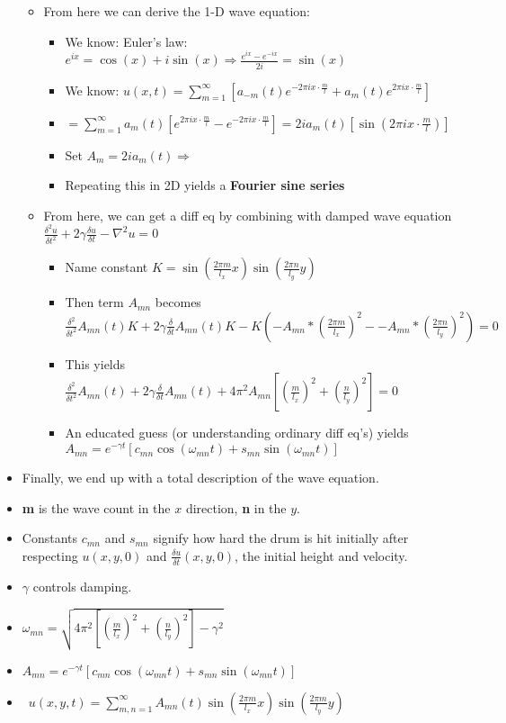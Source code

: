 \documentclass[11pt, oneside]{article}   	%
\begin{document}
\begin{itemize}
\begin{itemize}
\begin{itemize}
\end{itemize}
\item From here we can derive the 1-D wave equation:
\begin {itemize}
\item We know: Euler's law: $e^{ix} = \cos(x) + i\sin(x) \Rightarrow \frac{e^{ix} - e^{-ix}}{2i} = \sin(x)$
\item We know: $u(x,t) = \sum_{m=1}^{\infty}[a_{-m}(t)e^{-2\pi i x \cdot \frac{m}{l}} + a_{m}(t)e^{2\pi i x \cdot \frac{m}{l}}]$
\item $= \sum_{m=1}^{\infty}a_m(t)[e^{2\pi i x \cdot \frac{m}{l}} - e^{-2\pi i x \cdot \frac{m}{l}}] = 2ia_m(t)[\sin(2\pi i x \cdot \frac{m}{l})]$
\item Set $A_m = 2ia_m(t) \Rightarrow$ 
\item Repeating this in 2D yields a \textbf{Fourier sine series} 
\end{itemize}
\item From here, we can get a diff eq by combining with damped wave equation $\frac{\delta^2 u}{\delta t^2} + 2\gamma \frac{\delta u}{\delta t}  - \nabla ^2 u =0$
\begin{itemize}
\item Name constant $K = \sin(\frac{2 \pi m}{l_x}x)\sin(\frac{2 \pi n}{l_y}y)$
\item Then term $A_{mn}$ becomes $\frac{\delta^2}{\delta t^2} A_{mn}(t) K + 2\gamma \frac{\delta}{\delta t} A_{mn}(t)K - K(-A_{mn} * (\frac{2\pi m}{l_x})^2 - -A_{mn} * (\frac{2\pi n}{l_y})^2) = 0$
\item This yields $\frac{\delta^2}{\delta t^2} A_{mn}(t) + 2\gamma \frac{\delta}{\delta t} A_{mn}(t)  + 4\pi^2A_{mn}[ (\frac{m}{l_x})^2 +  (\frac{n}{l_y})^2] = 0$
\item An educated guess (or understanding ordinary diff eq's) yields $A_{mn} = e^{-\gamma t}[c_{mn}\cos(\omega_{mn} t) + s_{mn}\sin(\omega_{mn} t)]$
\end{itemize}
\end{itemize}
\item Finally, we end up with a total description of the wave equation.
\item \textbf{m} is the wave count in the $x$ direction, \textbf{n} in the $y$.
\item Constants $c_{mn}$ and $s_{mn}$ signify how hard the drum is hit initially after respecting $u(x,y,0)$ and $\frac{\delta u}{\delta t}(x,y,0)$, the initial height and velocity.
\item $\gamma$ controls damping.
\item $\omega_{mn} = \sqrt{4\pi^2 [(\frac{m}{l_x})^2 + (\frac{n}{l_y})^2] -\gamma^2}$
\item $A_{mn} = e^{-\gamma t}[c_{mn}\cos(\omega_{mn} t) + s_{mn}\sin(\omega_{mn} t)]$
\item\ $u(x,y,t) = \sum_{m,n = 1}^{\infty}A_{mn}(t)\sin(\frac{2\pi m}{l_x} x)\sin(\frac{2\pi m}{l_y} y)$
\end{itemize}
\end{document}
